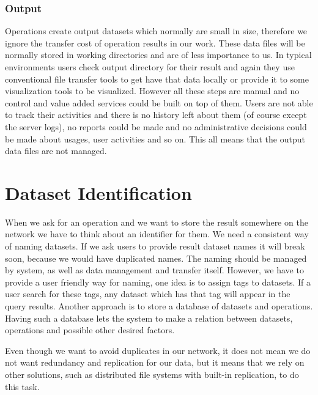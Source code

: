 \subsubsection{Output}
Operations create output datasets which normally are small in size, therefore we ignore the transfer cost of operation
results in our work. These data files will be normally stored in working directories and are of less importance to us.
In typical environments users check output directory for their result and again they use conventional file transfer
tools to get have that data locally or provide it to some visualization tools to be visualized. However all these steps
are manual and no control and value added services could be built on top of them. Users are not able to track their
activities and there is no history left about them (of course except the server logs), no reports could be made and no
administrative decisions could be made about usages, user activities and so on. This all means that the output data files
are not managed.


\section{Dataset Identification}
When we ask for an operation and we want to store the result somewhere on the network we have to think about an identifier
for them. 
We need a consistent way of naming datasets. If we ask users to provide result dataset names it will break soon, because we
would have duplicated names. The naming should be managed by system, as well as data management and transfer itself. 
However, we have to provide a user friendly way for naming, one idea is to assign tags to datasets. If a user search for
these tags, any dataset which has that tag will appear in the query results.
Another approach is to store a database of datasets and operations. Having such a database lets the system to make a relation
between datasets, operations and possible other desired factors.

Even though we want to avoid duplicates in our network, it does not mean we do not want redundancy and replication for our 
data, but it means that we rely on other solutions, such as distributed file systems with built-in replication, to do this task.

